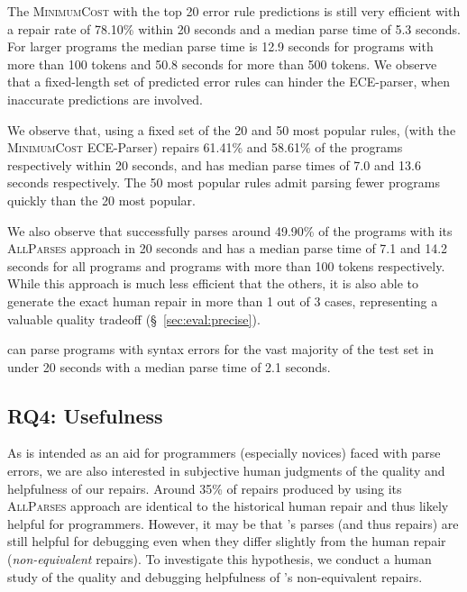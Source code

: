 The \textsc{MinimumCost} with the top 20 error rule predictions is still very
efficient with a repair rate of 78.10\% within 20 seconds and a median parse
time of 5.3 seconds. For larger programs the median parse time is 12.9 seconds
for programs with more than 100 tokens and 50.8 seconds for more than 500
tokens. We observe that a fixed-length set of predicted error rules can hinder
the ECE-parser, when inaccurate predictions are involved.

We observe that, using a fixed set of the 20 and 50 most popular rules,
\toolname (with the \textsc{MinimumCost} ECE-Parser) repairs 61.41\% and 58.61\%
of the programs respectively within 20 seconds, and has median parse times of
7.0 and 13.6 seconds respectively. The 50 most popular rules admit parsing fewer
programs quickly than the 20 most popular.

We also observe that \toolname successfully parses around 49.90\% of the
programs with its \textsc{AllParses} approach in 20 seconds and has a median
parse time of 7.1 and 14.2 seconds for all programs and programs with more than
100 tokens respectively. While this approach is much less efficient that the
others, it is also able to generate the exact human repair in more than 1 out of
3 cases, representing a valuable quality tradeoff (\S~\ref{sec:eval:precise}).

\begin{framed}
  \noindent \toolname can parse programs with syntax errors for the vast
  majority of the test set in under 20 seconds with a median parse time of 2.1
  seconds.
\end{framed}

\subsection{RQ4: Usefulness}
\label{sec:eval:useful}


As \toolname is intended as an aid for programmers (especially novices) faced
with parse errors, we are also interested in subjective human judgments of the
quality and helpfulness of our repairs. Around 35\% of repairs produced by
\toolname using its \textsc{AllParses} approach are identical to the historical
human repair and thus likely helpful for programmers. However, it may be that
\toolname's parses (and thus repairs) are still helpful for debugging even when
they differ slightly from the human repair (\ie \textit{non-equivalent}
repairs). To investigate this hypothesis, we conduct a human study of the
quality and debugging helpfulness of \toolname's non-equivalent repairs.

